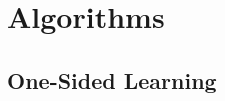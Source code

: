 \documentclass{article}
\newcommand{\UMA}{\mathcal{A}^{\texttt{UM}}}
\begin{document}
\section{Algorithms}
\label{app:pseudocode}
\subsection{One-Sided Learning}
\end{document}
